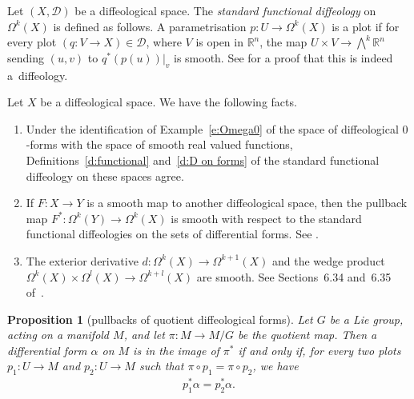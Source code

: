 \documentclass[pdftex]{sigma}
\numberwithin{equation}{section}
\newtheorem{Proposition}[Theorem]{Proposition}
\newcommand{\RR}{{\mathbb{R}}} %
\def \calD {{\mathcal{D}}}
\newcommand{\hypref}[2]{{#2~\ref{#1}}}
\begin{document}
\begin{Definition}
\label{d:D on forms}
Let $(X,\calD)$ be a dif\/feological space.
The \emph{standard functional diffeology} on $\Omega^k(X)$
is def\/ined as follows.
A parametrisation $p \colon U \to \Omega^k(X)$ is a plot
if for every plot $(q \colon V \to X) \in \mathcal{D}$,
where $V$ is open in $\RR^n$, the map $U \times V \to \bigwedge^k \RR^n$
sending $(u,v)$ to $q^*(p(u))|_v$ is smooth.
See \cite[Section~6.29]{iglesias} for a proof that this is indeed a~dif\/feology.
\end{Definition}

\begin{Remark}\label{r:formfacts}
Let $X$ be a dif\/feological space.
We have the following facts.
\begin{enumerate}\itemsep=0pt

\item %
Under the identif\/ication of \hypref{e:Omega0}{Example}
of the space of dif\/feological $0$-forms
with the space of smooth real valued functions,
Def\/initions~\ref{d:functional} and~\ref{d:D on forms}
of the standard functional dif\/feology on these spaces agree.

\item \label{f:pullback is sm}
If $F \colon X \to Y$ is a smooth map to another dif\/feological space,
then the pullback map $F^* \colon \Omega^k(Y) \to \Omega^k(X)$
is smooth with respect to the standard functional dif\/feologies
on the sets of dif\/ferential forms.
See \cite[Section~6.32]{iglesias}.

\item
The exterior derivative
$d \colon \Omega^k(X)\to\Omega^{k+1}(X)$ and the wedge product
$ \Omega^k (X) \times \Omega^l (X) \to \Omega^{k+l} (X)$ are smooth.
See Sections~6.34 and~6.35 of~\cite{iglesias}.
\end{enumerate}
\end{Remark}

\begin{Proposition}[pullbacks of quotient dif\/feological forms]\label{p:pullbackimgchar}
Let $G$ be a Lie group, acting on a manifold $M$,
and let $\pi \colon M \to M/G$ be the quotient map.
Then a differential form $\alpha$ on $M$ is in the image of $\pi^*$
if and only if, for every two plots $p_1 \colon U\to M$
and $p_2 \colon U \to M$ such that $\pi \circ p_1 = \pi \circ p_2$, we have
\begin{gather*} p_1^* \alpha = p_2^* \alpha. \end{gather*}
\end{Proposition}
\end{document}
